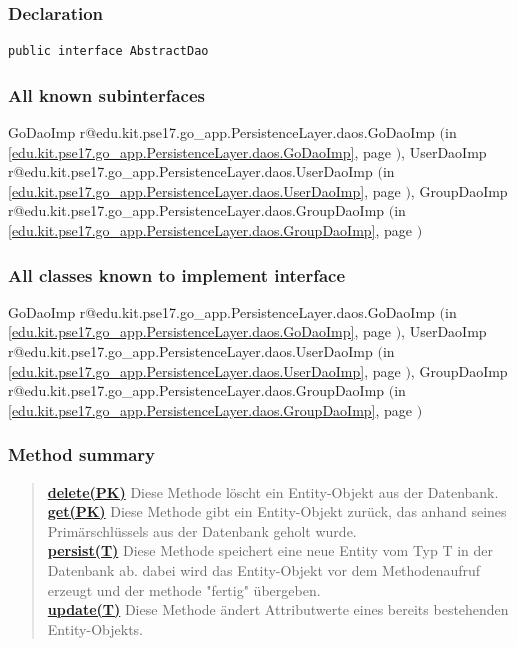 \documentclass[11pt,a4paper]{report}
\makeatletter
\newcommand{\refdefined}[1]{
\expandafter\ifx\csname r@#1\endcsname\relax
\relax\else
{$($in \ref{#1}, page \pageref{#1}$)$}\fi}
\makeatother
\begin{document}
{{{{{{{\subsubsection{Declaration}{
\begin{lstlisting}[frame=none]
public interface AbstractDao
\end{lstlisting}
\subsubsection{All known subinterfaces}{GoDaoImp\small{\refdefined{edu.kit.pse17.go_app.PersistenceLayer.daos.GoDaoImp}}, UserDaoImp\small{\refdefined{edu.kit.pse17.go_app.PersistenceLayer.daos.UserDaoImp}}, GroupDaoImp\small{\refdefined{edu.kit.pse17.go_app.PersistenceLayer.daos.GroupDaoImp}}}
\subsubsection{All classes known to implement interface}{GoDaoImp\small{\refdefined{edu.kit.pse17.go_app.PersistenceLayer.daos.GoDaoImp}}, UserDaoImp\small{\refdefined{edu.kit.pse17.go_app.PersistenceLayer.daos.UserDaoImp}}, GroupDaoImp\small{\refdefined{edu.kit.pse17.go_app.PersistenceLayer.daos.GroupDaoImp}}}
\subsubsection{Method summary}{
\begin{verse}
\hyperlink{edu.kit.pse17.go_app.PersistenceLayer.daos.AbstractDao.delete(PK)}{{\bf delete(PK)}} Diese Methode löscht ein Entity-Objekt aus der Datenbank.\\
\hyperlink{edu.kit.pse17.go_app.PersistenceLayer.daos.AbstractDao.get(PK)}{{\bf get(PK)}} Diese Methode gibt ein Entity-Objekt zurück, das anhand seines Primärschlüssels aus der Datenbank geholt wurde.\\
\hyperlink{edu.kit.pse17.go_app.PersistenceLayer.daos.AbstractDao.persist(T)}{{\bf persist(T)}} Diese Methode speichert eine neue Entity vom Typ T in der Datenbank ab. dabei wird das Entity-Objekt vor dem Methodenaufruf erzeugt und der methode "fertig" übergeben.\\
\hyperlink{edu.kit.pse17.go_app.PersistenceLayer.daos.AbstractDao.update(T)}{{\bf update(T)}} Diese Methode ändert Attributwerte eines bereits bestehenden Entity-Objekts.\\
\end{verse}
}
}}}}}}}}
\end{document}
